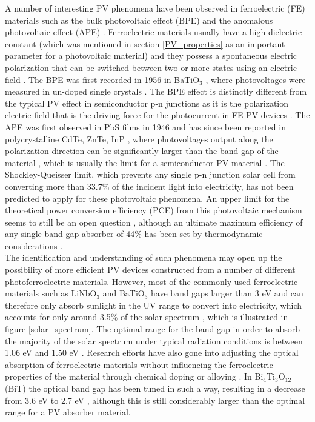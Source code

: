 A number of interesting PV phenomena have been observed in ferroelectric (FE) materials  such as the bulk photovoltaic effect (BPE) and the anomalous photovoltaic effect (APE) \cite{keith}. Ferroelectric materials usually have a high dielectric constant (which was mentioned in section \ref{PV_properties} as an important parameter for a photovoltaic material) and they possess a spontaneous electric polarization that can be switched between two or more states using an electric field \cite{new_FE_PV_1}.
The BPE was first recorded in 1956 in BaTiO$_3$ \cite{keith_46}, where photovoltages were measured in un-doped single crystals \cite{keith}.
The BPE effect is distinctly different from the typical PV effect in semiconductor
p-n junctions as it is the polarization electric field that is the driving force for the photocurrent in FE-PV devices \cite{FE_PV_rev1}. 
The APE was first observed in PbS films in 1946 \cite{keith_54} and has since been reported in polycrystalline CdTe, ZnTe, InP \cite{keith_55, keith_56, keith_57}, where photovoltages output along the polarization direction can be significantly larger than the band gap of the material \cite{FE_PV_rev1}, which is usually the limit for a semiconductor PV material \cite{keith}. 
The Shockley-Queisser limit, which prevents any single p-n junction solar cell from converting more than 33.7\% of the incident light into electricity, has not been predicted to apply for these photovoltaic phenomena. An upper limit for the theoretical power conversion efficiency (PCE) from this photovoltaic mechanism seems to still be an open question \cite{new_FE_PV}, although an ultimate maximum efficiency of any single-band gap absorber of 44\% has been set by thermodynamic considerations \cite{SQ_1961}.\\ %

The identification and understanding of such phenomena may open up the possibility of more efficient PV devices constructed from a number of different photoferroelectric materials. However, most of the commonly used ferroelectric materials such as LiNbO$_3$ and BaTiO$_3$ have band gaps larger than 3 eV and can therefore only absorb sunlight in the UV range to convert into electricity, which accounts for only around 3.5\% of the solar spectrum \cite{FE_PV_rev1}, which is illustrated in figure \ref{solar_spectrum}. The optimal range for the band gap in order to absorb the majority of the solar spectrum under typical radiation conditions is between 1.06 eV and 1.50 eV \cite{CZTS_book}. Research efforts have also gone into adjusting the optical absorption of ferroelectric materials without influencing the ferroelectric properties of the material through chemical doping or alloying \cite{FE_PV_rev1}. In Bi$_4$Ti$_3$O$_{12}$ (BiT) the optical band gap has been tuned in such a way, resulting in a decrease from 3.6 eV to 2.7 eV \cite{FE_PV_rev1_83}, although this is still considerably larger than the optimal range for a PV absorber material.\\

